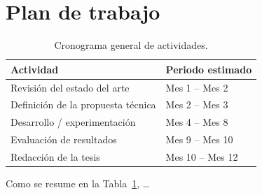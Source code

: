 \section{Plan de trabajo}
\label{sec:plan-trabajo}


\begin{table}[H]
  \centering
  \caption{Cronograma general de actividades.}
  \label{tab:cronograma}
  \begin{tabular}{@{}p{}p{}@{}}
    \toprule
    \textbf{Actividad} & \textbf{Periodo estimado} \\
    \midrule
    Revisión del estado del arte       & Mes 1 -- Mes 2  \\
    Definición de la propuesta técnica & Mes 2 -- Mes 3  \\
    Desarrollo / experimentación       & Mes 4 -- Mes 8  \\
    Evaluación de resultados           & Mes 9 -- Mes 10 \\
    Redacción de la tesis              & Mes 10 -- Mes 12 \\
    \bottomrule
  \end{tabular}
\end{table}

Como se resume en la Tabla~\ref{tab:cronograma}, \dots
